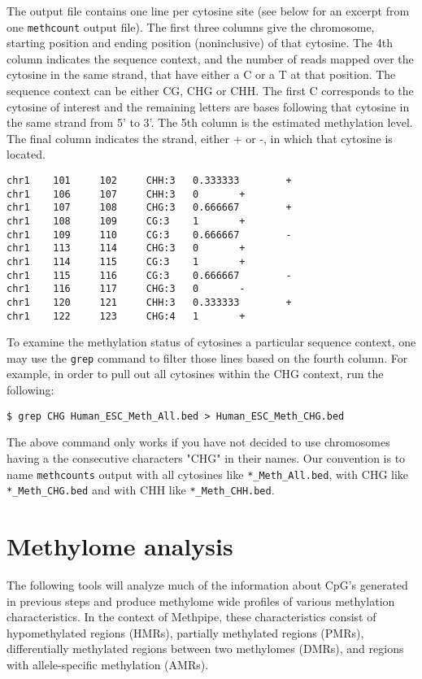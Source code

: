 \documentclass[10pt]{article}
\newcommand{\prog}[1]{\texttt{#1}}
\newcommand{\fn}[1]{\texttt{#1}}
\begin{document}
The output file contains one line per cytosine site (see below for an
excerpt from one \prog{methcount} output file). The first three
columns give the chromosome, starting position and ending position
(noninclusive) of that cytosine. The 4th column indicates the sequence
context, and the number of reads mapped over the cytosine in the same
strand, that have either a C or a T at that position. The sequence
context can be either CG, CHG or CHH. The first C corresponds to the
cytosine of interest and the remaining letters are bases following
that cytosine in the same strand from 5' to 3'. The 5th column is the
estimated methylation level. The final column indicates the strand,
either + or -, in which that cytosine is located.
{\small{%
\begin{verbatim}
chr1    101     102     CHH:3   0.333333        +
chr1    106     107     CHH:3   0       +
chr1    107     108     CHG:3   0.666667        +
chr1    108     109     CG:3    1       +
chr1    109     110     CG:3    0.666667        -
chr1    113     114     CHG:3   0       +
chr1    114     115     CG:3    1       +
chr1    115     116     CG:3    0.666667        -
chr1    116     117     CHG:3   0       -
chr1    120     121     CHH:3   0.333333        +
chr1    122     123     CHG:4   1       +
\end{verbatim}%
}}

To examine the methylation status of cytosines a particular sequence
context, one may use the \prog{grep} command to filter those lines
based on the fourth column. For example, in order to pull out all
cytosines within the CHG context, run the following:
\begin{verbatim}
$ grep CHG Human_ESC_Meth_All.bed > Human_ESC_Meth_CHG.bed
\end{verbatim}
The above command only works if you have not decided to use
chromosomes having a the consecutive characters "CHG" in their names.
Our convention is to name \prog{methcounts} output with all cytosines
like \fn{*\_Meth\_All.bed}, with CHG like \fn{*\_Meth\_CHG.bed} and
with CHH like \fn{*\_Meth\_CHH.bed}.

\section{Methylome analysis}
\label{sec:high-level-analys}

The following tools will analyze much of the information about CpG's
generated in previous steps and produce methylome wide profiles of
various methylation characteristics. In the context of Methpipe, these
characteristics consist of hypomethylated regions (HMRs), partially
methylated regions (PMRs), differentially methylated regions between
two methylomes (DMRs), and regions with allele-specific methylation
(AMRs).
\end{document}
